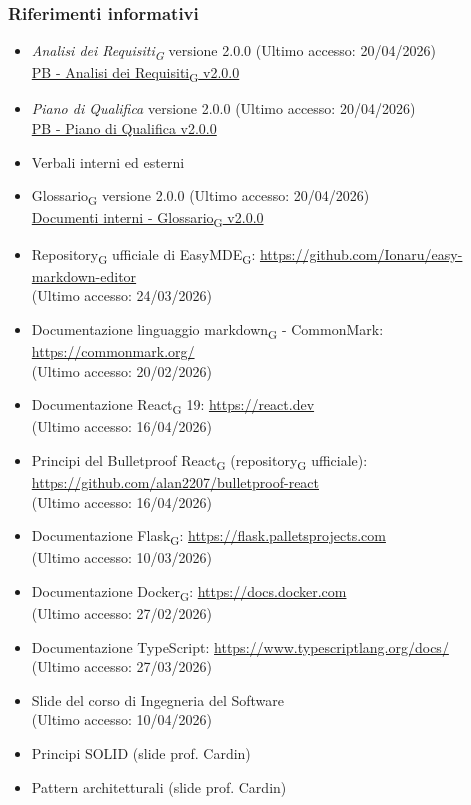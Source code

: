 \documentclass[11pt,a4paper]{article}
\newcommand{\gls}[1]{#1\textsubscript{G}}
\begin{document}
\subsubsection{Riferimenti informativi}
\begin{itemize}
    \item \textit{\gls{Analisi dei Requisiti}} versione 2.0.0 (Ultimo accesso: 20/04/2026)\\
    \href{https://byteme25.github.io/ByteMe/}{PB - \gls{Analisi dei Requisiti} v2.0.0}
    \item \textit{Piano di Qualifica} versione 2.0.0 (Ultimo accesso: 20/04/2026) \\
    \href{https://byteme25.github.io/ByteMe/}{PB - Piano di Qualifica v2.0.0}
    \item Verbali interni ed esterni
    \item \gls{Glossario} versione 2.0.0 (Ultimo accesso: 20/04/2026)\\
    \href{https://byteme25.github.io/ByteMe/files.html}{Documenti interni - \gls{Glossario} v2.0.0}
    \item \gls{Repository} ufficiale di \gls{EasyMDE}: \url{https://github.com/Ionaru/easy-markdown-editor}\\ (Ultimo accesso: 24/03/2026)
     \item Documentazione linguaggio \gls{markdown} - CommonMark: \url{https://commonmark.org/}\\ (Ultimo accesso: 20/02/2026)
    \item Documentazione \gls{React} 19: \url{https://react.dev}\\ (Ultimo accesso: 16/04/2026)
    \item Principi del Bulletproof \gls{React} (\gls{repository} ufficiale): \url{https://github.com/alan2207/bulletproof-react}\\ (Ultimo accesso: 16/04/2026)
    \item Documentazione \gls{Flask}: \url{https://flask.palletsprojects.com}\\ (Ultimo accesso: 10/03/2026)
    \item Documentazione \gls{Docker}: \url{https://docs.docker.com}\\ (Ultimo accesso: 27/02/2026)
    \item Documentazione TypeScript: \url{https://www.typescriptlang.org/docs/}\\ (Ultimo accesso: 27/03/2026)

    \item Slide del corso di Ingegneria del Software\\ (Ultimo accesso: 10/04/2026)
    \item Principi SOLID (slide prof. Cardin)
    \item Pattern architetturali (slide prof. Cardin)
\end{itemize}
\end{document}
